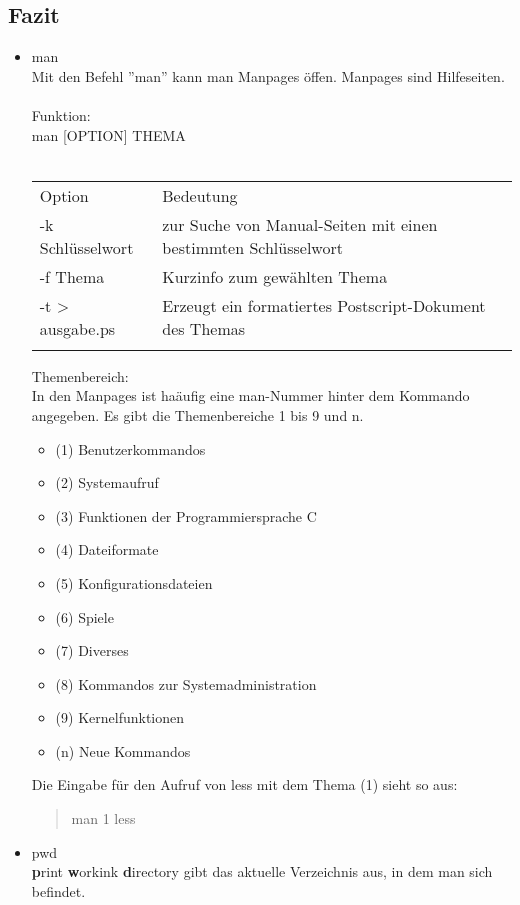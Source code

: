 	\subsection{Fazit}
		\begin{itemize}
			\item man\\
			Mit den Befehl ''man'' kann man Manpages \"offen. Manpages sind Hilfeseiten.\\ \\
			Funktion:\\
			man [OPTION] THEMA\\ \\
			\begin{tabular}{ll}
				Option & Bedeutung \\
				-k Schl\"usselwort & zur Suche von Manual-Seiten mit einen bestimmten Schl\"usselwort \\
				-f Thema & Kurzinfo zum gew\"ahlten Thema \\
				-t > ausgabe.ps & Erzeugt ein formatiertes Postscript-Dokument des Themas\\ \\
			\end{tabular}
			Themenbereich:\\
			In den Manpages ist ha\"aufig eine man-Nummer hinter dem Kommando angegeben. Es gibt die Themenbereiche 1 bis 9 und n.
			\begin{itemize}
				\item (1) Benutzerkommandos
				\item (2) Systemaufruf
				\item (3) Funktionen der Programmiersprache C
				\item (4) Dateiformate
				\item (5) Konfigurationsdateien
				\item (6) Spiele
				\item (7) Diverses
				\item (8) Kommandos zur Systemadministration
				\item (9) Kernelfunktionen
				\item (n) Neue Kommandos
			\end{itemize}
			Die Eingabe f\"ur den Aufruf von less mit dem Thema (1) sieht so aus: \begin{quote}
				man 1 less
			\end{quote}
			\newpage
			\item pwd\\
			\textbf{p}rint \textbf{w}orkink \textbf{d}irectory gibt das aktuelle Verzeichnis aus, in dem man sich befindet.\\ \\

\end{itemize}

